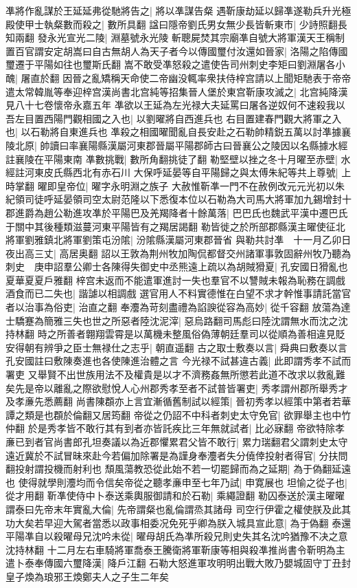 凖將作亂謀於王延延弗從馳將告之|{
	將以凖謀告粲}
遇靳康劫延以歸凖遂勒兵升光極殿使甲士執粲數而殺之|{
	數所具翻}
諡曰隱帝劉氏男女無少長皆斬東市|{
	少詩照翻長知兩翻}
發永光宣光二陵|{
	淵墓號永光陵}
斬聰屍焚其宗廟凖自號大將軍漢天王稱制置百官謂安定胡嵩曰自古無胡人為天子者今以傳國璽付汝還如晉家|{
	洛陽之陷傳國璽遷于平陽如往也璽斯氏翻}
嵩不敢受凖怒殺之遣使告司州刺史李矩曰劉淵屠各小醜|{
	屠直於翻}
因晉之亂矯稱天命使二帝幽没輒率衆扶侍梓宫請以上聞矩馳表于帝帝遣太常韓胤等奉迎梓宫漢尚書北宫純等招集晉人堡於東宫靳康攻滅之|{
	北宫純降漢見八十七卷懷帝永嘉五年}
凖欲以王延為左光禄大夫延罵曰屠各逆奴何不速殺我以吾左目置西陽門觀相國之入也|{
	以劉曜將自西進兵也}
右目置建春門觀大將軍之入也|{
	以石勒將自東進兵也}
凖殺之相國曜聞亂自長安赴之石勒帥精鋭五萬以討凖據襄陵北原|{
	帥讀曰率襄陽縣漢屬河東郡晉屬平陽郡師古曰晉襄公之陵因以名縣據水經註襄陵在平陽東南}
凖數挑戰|{
	數所角翻挑徒了翻}
勒堅壁以挫之冬十月曜至赤壁|{
	水經註河東皮氏縣西北有赤石川}
大保呼延晏等自平陽歸之與太傅朱紀等共上尊號|{
	上時掌翻}
曜即皇帝位|{
	曜字永明淵之族子}
大赦惟靳凖一門不在赦例改元元光初以朱紀領司徒呼延晏領司空太尉范隆以下悉復本位以石勒為大司馬大將軍加九錫增封十郡進爵為趙公勒進攻凖於平陽巴及羌羯降者十餘萬落|{
	巴巴氏也魏武平漢中遷巴氏于關中其後種類滋蔓河東平陽皆有之羯居謁翻}
勒皆徙之於所部郡縣漢主曜使征北將軍劉雅鎮北將軍劉策屯汾隂|{
	汾隂縣漢屬河東郡晉省}
與勒共討凖　十一月乙卯日夜出高三丈|{
	高居奥翻}
詔以王敦為荆州牧加陶侃都督交州諸軍事敦固辭州牧乃聽為刺史　庚申詔羣公卿士各陳得失御史中丞熊遠上疏以為胡賊猾夏|{
	孔安國日猾亂也夏華夏夏戶雅翻}
梓宫未返而不能遣軍進討一失也羣官不以讐賊未報為恥務在調戲酒食而已二失也|{
	諧謔以相調戲}
選官用人不料實德惟在白望不求才幹惟事請託當官者以治事為俗吏|{
	治直之翻}
奉灋為苛刻盡禮為諂諛從容為高妙|{
	從千容翻}
放蕩為達士驕蹇為簡雅三失也世之所惡者陸沈泥滓|{
	惡烏路翻司馬彪曰陸沈謂無水而沈之沈持林翻}
時之所善者翺翔雲霄是以萬機未整風俗偽薄朝廷羣司以從順為善相違見貶安得朝有辨爭之臣士無禄仕之志乎|{
	朝直遥翻}
古之取士敷奏以言|{
	舜典曰敷奏以言孔安國註曰敷陳奏進也各使陳進治體之言}
今光禄不試甚違古義|{
	此即謂秀孝不試而署吏}
又舉賢不出世族用法不及權貴是以才不濟務姦無所懲若此道不改求以救亂難矣先是帝以離亂之際欲慰悅人心州郡秀孝至者不試普皆署吏|{
	秀孝謂州郡所舉秀才及孝亷先悉薦翻}
尚書陳頵亦上言宜漸循舊制試以經策|{
	晉初秀孝以經策中第者若華譚之類是也頵於倫翻又居筠翻}
帝從之仍詔不中科者刺史太守免官|{
	欲罪舉主也中竹仲翻}
於是秀孝皆不敢行其有到者亦皆託疾比三年無就試者|{
	比必寐翻}
帝欲特除孝亷已到者官尚書郎孔坦奏議以為近郡懼累君父皆不敢行|{
	累力瑞翻君父謂刺史太守}
遠近冀於不試冒昧來赴今若偏加除署是為謹身奉灋者失分僥倖投射者得官|{
	分扶問翻投射謂投機而射利也}
頹風蕩教恐從此始不若一切罷歸而為之延期|{
	為于偽翻延遠也}
使得就學則灋均而令信矣帝從之聽孝亷申至七年乃試|{
	申寛展也}
坦愉之從子也|{
	從才用翻}
靳凖使侍中卜泰送乘輿服御請和於石勒|{
	乘繩證翻}
勒囚泰送於漢主曜曜謂泰曰先帝末年實亂大倫|{
	先帝謂粲也亂倫謂烝其諸母}
司空行伊霍之權使朕及此其功大矣若早迎大駕者當悉以政事相委况免死乎卿為朕入城具宣此意|{
	為于偽翻}
泰還平陽凖自以殺曜母兄沈吟未從|{
	曜母胡氏為凖所殺兄則史失其名沈吟猶豫不决之意沈持林翻}
十二月左右車騎將軍喬泰王騰衛將軍靳康等相與殺凖推尚書令靳明為主遣卜泰奉傳國六璽降漢|{
	降戶江翻}
石勒大怒進軍攻明明出戰大敗乃嬰城固守丁丑封皇子煥為琅邪王煥鄭夫人之子生二年矣

